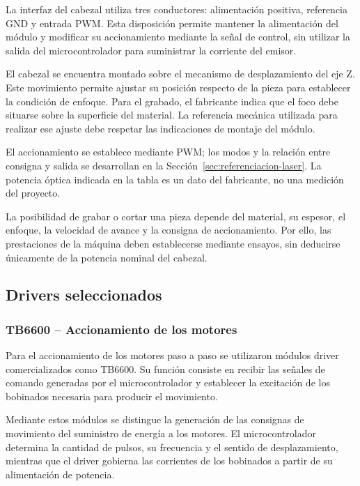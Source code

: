 \documentclass[blue,fullpaper]{ludusofficial}  %
\begin{document}
La interfaz del cabezal utiliza tres
conductores: alimentación positiva,
referencia GND y entrada PWM.
Esta disposición permite mantener
la alimentación del módulo y modificar
su accionamiento mediante la señal
de control, sin utilizar la salida
del microcontrolador para suministrar
la corriente del emisor.

El cabezal se encuentra montado sobre
el mecanismo de desplazamiento del eje Z.
Este movimiento permite ajustar su posición
respecto de la pieza para establecer
la condición de enfoque. Para el grabado,
el fabricante indica que el foco debe
situarse sobre la superficie del material.
La referencia mecánica utilizada para
realizar ese ajuste debe respetar
las indicaciones de montaje del módulo.

El accionamiento se establece mediante PWM; los modos y la relación entre consigna y salida se desarrollan en la Sección~\ref{sec:referenciacion-laser}. La potencia óptica indicada en la tabla es un dato del fabricante, no una medición del proyecto.

La posibilidad de grabar o cortar una pieza
depende del material, su espesor,
el enfoque, la velocidad de avance
y la consigna de accionamiento.
Por ello, las prestaciones de la máquina
deben establecerse mediante ensayos,
sin deducirse únicamente de la potencia
nominal del cabezal.

\subsection{Drivers seleccionados}
\label{subsec:drivers}

\subsubsection{TB6600 -- Accionamiento de los motores}

Para el accionamiento de los motores paso a paso
se utilizaron módulos driver comercializados como
TB6600. Su función consiste en recibir las señales
de comando generadas por el microcontrolador y
establecer la excitación de los bobinados necesaria
para producir el movimiento.

Mediante estos módulos se distingue la generación
de las consignas de movimiento del suministro
de energía a los motores. El microcontrolador
determina la cantidad de pulsos, su frecuencia
y el sentido de desplazamiento, mientras que
el driver gobierna las corrientes de los
bobinados a partir de su alimentación de potencia.
\end{document}
